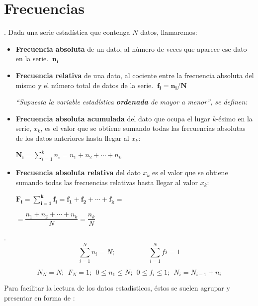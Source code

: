 \section{Frecuencias}
	
\begin{definition} .
	Dada una serie estadística que contenga $N$ datos, llamaremos:
	
	\begin{itemize}
	\item \textbf{Frecuencia absoluta}	de un dato, al número de veces que aparece ese dato en la serie. $\ \boldsymbol{n_i}$
	\item \textbf{Frecuencia relativa} de una dato, al cociente entre la frecuencia absoluta del mismo y el número total de datos de la serie. $\ \boldsymbol{f_i=n_i/N}$
	\vspace{1 cm}
	
	\emph{``Supuesta la variable estadística \textbf{ordenada} de mayor a menor'', se definen:}
	
	\item \textbf{Frecuencia absoluta acumulada} del dato que ocupa el lugar $k$-ésimo en la serie, $x_k$,  es el valor que se obtiene sumando todas las frecuencias absolutas de los datos anteriores hasta llegar al $x_k$:
	
	$\boldsymbol{N_i}=\displaystyle \sum_{i=1}^k n_i=n_1+n_2+ \cdots + n_k$
	
	\item \textbf{Frecuencia absoluta relativa} del dato $x_k$ es el valor que se obtiene sumando todas las frecuencias relativas hasta llegar al valor $x_k$:
	
	$\boldsymbol{F_i=\displaystyle \sum_{i=1}^k f_i=f_1+f_2+ \cdots + f_k=}$
	
	\hspace {1 cm} \textcolor{gris}{$= \dfrac{n_1+n_2+\cdots +n_k}{N}=\dfrac{n_k}N$}
	\end{itemize}
\end{definition}

\vspace{5mm}%
\begin{theorem} .
	$$ \displaystyle \sum_{i=1}^N n_i=N; \hspace{2cm} \sum_{i=1}^N fi=1$$
	
	$$N_N=N; \ \ F_N=1;\ \ 0\le n_1\le N; \ \ 0\le f_i\le 1; \ \ N_i=N_{i-1}+n_i$$
\end{theorem}

Para facilitar la lectura de los datos estadísticos, éstos se suelen agrupar y presentar en forma de :

